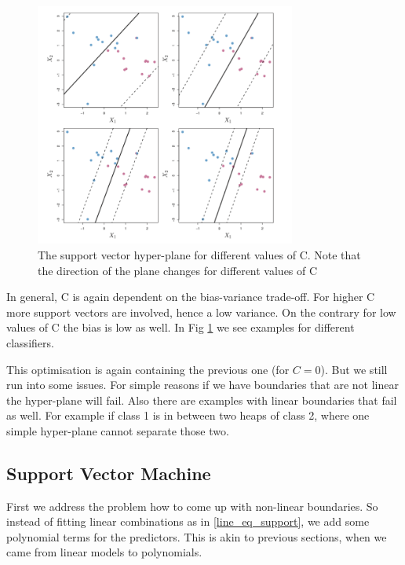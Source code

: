 \documentclass{article}
\begin{document}
\begin{figure}[ht]
    \centering
    \includegraphics[height=80mm]{support_vector_classifier.png}
    \caption{The support vector hyper-plane for different values of C. Note that the direction of the plane changes for different values of C}
    \label{support_vector_classifier}
\end{figure}
In general, C is again dependent on the bias-variance trade-off. For higher C more support vectors are involved, hence a low variance. On the contrary for low values of C the bias is low as well. In Fig \ref{support_vector_classifier} we see examples for different classifiers. 

This optimisation is again containing the previous one (for $C=0$). But we still run into some issues. For simple reasons if we have boundaries that are not linear the hyper-plane will fail. Also there are examples with linear boundaries that fail as well. For example if class 1 is in between two heaps of class 2, where one simple hyper-plane cannot separate those two. 

\subsection{Support Vector Machine}

First we address the problem how to come up with non-linear boundaries. So instead of fitting linear combinations as in \eqref{line_eq_support}, we add some polynomial terms for the predictors. This is akin to previous sections, when we came from linear models to polynomials. 
\end{document}
